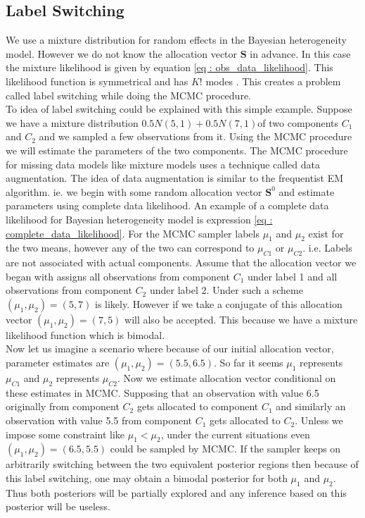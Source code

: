 \subsection{Label Switching}
We use a mixture distribution for random effects in the Bayesian heterogeneity model. However we do not know the allocation vector $\boldsymbol{S}$ in advance. In this case the mixture likelihood is given by equation \ref{eq : obs_data_likelihood}. This likelihood function is symmetrical and has $K!$ modes \citep[pg. 44]{fruhwirth-schnatter_finite_2013}. This creates a problem called label switching while doing the MCMC procedure.\\

To idea of label switching could be explained with this simple example. Suppose we have a mixture distribution $0.5N(5,1) + 0.5N(7,1)$of two components $C_1$ and $C_2$ and we sampled a few observations from it. Using the MCMC procedure we will estimate the parameters of the two components. The MCMC procedure for missing data models like mixture models uses a technique called data augmentation. The idea of data augmentation is similar to the frequentist EM algorithm. ie. we begin with some random allocation vector $\boldsymbol{S}^0$ and estimate parameters using complete data likelihood. An example of a complete data likelihood for Bayesian heterogeneity model is expression \ref{eq : complete_data_likelihood}. For the MCMC sampler labels $\mu_1$ and $\mu_2$ exist for the two means, however any of the two can correspond to $\mu_{C1}$ or $\mu_{C2}$. i.e. Labels are not associated with actual components. Assume that the allocation vector we began with assigns all observations from component $C_1$ under label 1 and all observations from component $C_2$ under label 2. Under such a scheme $(\mu_1,\mu_2) = (5,7)$ is likely. However if we take a conjugate of this allocation vector $(\mu_1,\mu_2) = (7,5)$ will also be accepted. This because we have a mixture likelihood function which is bimodal.\\

Now let us imagine a scenario where because of our initial allocation vector, parameter estimates are $(\mu_1, \mu_2) = (5.5,6.5)$. So far it seems $\mu_1$ represents $\mu_{C1}$ and $\mu_2$ represents $\mu_{C2}$. Now we estimate allocation vector conditional on these estimates in MCMC. Supposing that an observation with value 6.5 originally from component $C_2$ gets allocated to component $C_1$ and similarly an observation with value 5.5 from component $C_1$ gets allocated to $C_2$. Unless we impose some constraint like $\mu_1 < \mu_2$, under the current situations even $(\mu_1,\mu_2) = (6.5, 5.5)$ could be sampled by MCMC. If the sampler keeps on arbitrarily switching between the two equivalent posterior regions then because of this label switching, one may obtain a bimodal posterior for both $\mu_1$ and $\mu_2$. Thus both posteriors will be partially explored and any inference based on this posterior will be useless.

